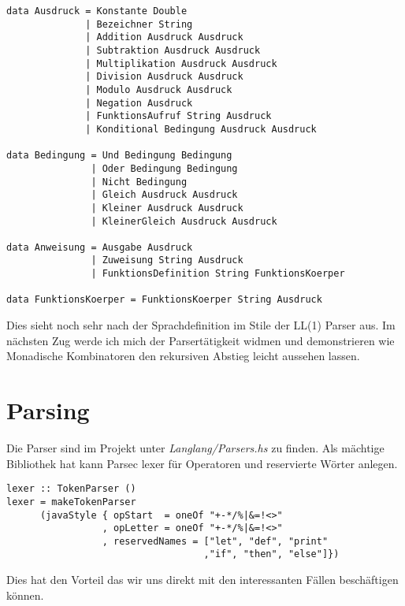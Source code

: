 \documentclass[12pt,german]{article}
\begin{document}
\begin{lstlisting}[caption=Datentypen]
data Ausdruck = Konstante Double
              | Bezeichner String
              | Addition Ausdruck Ausdruck
              | Subtraktion Ausdruck Ausdruck
              | Multiplikation Ausdruck Ausdruck
              | Division Ausdruck Ausdruck
              | Modulo Ausdruck Ausdruck
              | Negation Ausdruck
              | FunktionsAufruf String Ausdruck
              | Konditional Bedingung Ausdruck Ausdruck

data Bedingung = Und Bedingung Bedingung
               | Oder Bedingung Bedingung
               | Nicht Bedingung
               | Gleich Ausdruck Ausdruck
               | Kleiner Ausdruck Ausdruck
               | KleinerGleich Ausdruck Ausdruck

data Anweisung = Ausgabe Ausdruck
               | Zuweisung String Ausdruck
               | FunktionsDefinition String FunktionsKoerper

data FunktionsKoerper = FunktionsKoerper String Ausdruck
\end{lstlisting}

Dies sieht noch sehr nach der Sprachdefinition im Stile der LL(1)
Parser aus. Im nächsten Zug werde ich mich der Parsertätigkeit
widmen und demonstrieren wie Monadische Kombinatoren den rekursiven
Abstieg leicht aussehen lassen.

\section{Parsing}

Die Parser sind im Projekt unter \textit{Langlang/Parsers.hs} zu
finden. Als mächtige Bibliothek hat kann Parsec lexer für Operatoren
und reservierte Wörter anlegen.

\begin{lstlisting}[caption=built-in lexeme generator]
lexer :: TokenParser ()
lexer = makeTokenParser
      (javaStyle { opStart  = oneOf "+-*/%|&=!<>"
                 , opLetter = oneOf "+-*/%|&=!<>"
                 , reservedNames = ["let", "def", "print"
                                   ,"if", "then", "else"]})
\end{lstlisting}

\noindent Dies hat den Vorteil das wir uns direkt mit den interessanten Fällen
beschäftigen können.
\end{document}
